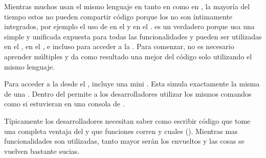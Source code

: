 Mientras muchos \frameworks usan el mismo lenguaje en tanto en \clientAS como en \serverAS, la mayoría del tiempo estos no pueden compartir código porque los \frameworks no son íntimamente integrados, por ejemplo el uso de \angularjs en el \frontEndAS y \expressjsNAME en el \backend. \meteor es un \fullstack verdadero porque usa una simple y unificada \api expuesta para todas las funcionalidades \coreAS y pueden ser utilizadas en el \serverAS, en el \browser, e incluso para acceder a la \dataBase. Para comenzar, no es necesario aprender múltiples \frameworks y da como resultado una mejor \reusability del código solo utilizando el mismo lenguaje.

Para acceder a la \dataBase desde el \browser, \meteor incluye una mini \dataBase. Esta simula exactamente la misma \api de una \dataBase. Dentro del \browser \minimongo permite a los desarrolladores utilizar los mismos comandos como si estuvieran en una consola de \mongodbNAME.

Típicamente los desarrolladores necesitan saber como escribir código que tome una completa ventaja del \eventloopCPT y que funciones corren \synchronously y cuales \asynchronously (). Mientras mas funcionalidades \asynchronously son utilizadas, tanto mayor serán los \callbacksPL envueltos y las cosas se vuelven bastante sucias.

